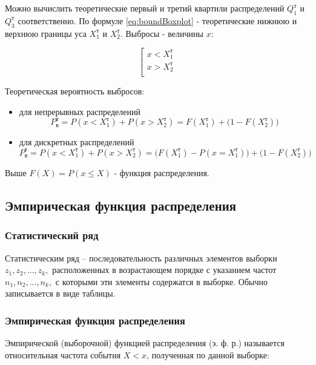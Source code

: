 \documentclass{article}
\begin{document}
Можно вычислить теоретические первый и третий квартили распределений $Q_1^\text{т}$ и $Q_3^\text{т}$ соответственно. По формуле \eqref{eq:boundBoxplot} - теоретические нижнюю и верхнюю границы уса $X_1^\text{т}$ и $X_2^\text{т}$. Выбросы - величины $x$:

\begin{equation}
    \left[ 
        \begin{gathered} 
            x < X_1^\text{т}\\ 
            x > X_2^\text{т}\\ 
        \end{gathered} 
    \right.
\end{equation}

Теоретическая вероятность выбросов:

\begin{itemize}
    \item для непрерывных распределений
    \begin{equation} \label{eq:probTheorCont}
    P_\text{в}^\text{т} = P(x < X_1^\text{т}) + P(x > X_2^\text{т}) = F(X_1^\text{т}) + \Big(1 - F(X_2^\text{т})\Big)
    \end{equation}
    \item для дискретных распределений
    \begin{equation} \label{eq:probTheorDisc}
    P_\text{в}^\text{т} = P(x < X_1^\text{т}) + P(x > X_2^\text{т}) = \Big(F(X_1^\text{т}) - P(x = X_1^\text{т})\Big) + \Big(1 - F(X_2^\text{т})\Big)
    \end{equation}
\end{itemize}
Выше $F(X) = P(x \le X)$ - функция распределения.

\subsection{Эмпирическая функция распределения}

\subsubsection{Статистический ряд}
Статистическим ряд – последовательность различных элементов выборки $z_1, z_2, ..., z_k,$ расположенных в возрастающем порядке с указанием частот $n_1, n_2, ..., n_k,$ с которыми эти элементы содержатся в выборке. Обычно записывается в виде таблицы.

\subsubsection{Эмпирическая функция распределения}
Эмпирической (выборочной) функцией распределения (э. ф. р.) называется относительная частота события $X < x$, полученная по данной выборке:
\end{document}
